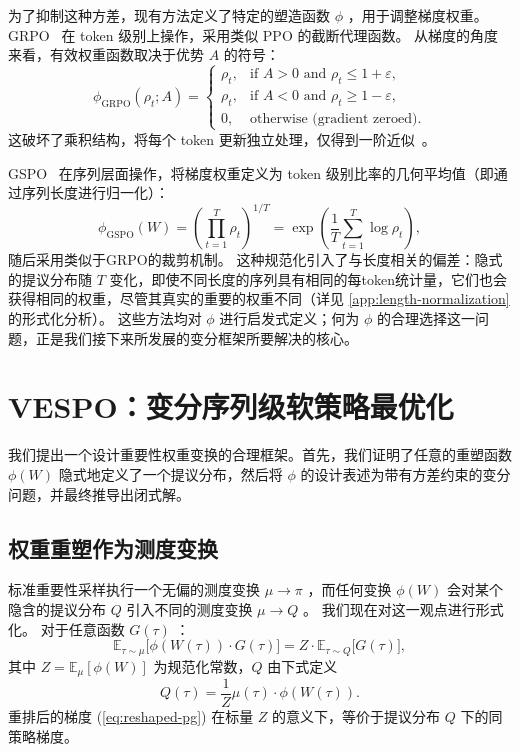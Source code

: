 \documentclass{article}
\theoremstyle{plain}
\theoremstyle{definition}
\theoremstyle{remark}
\begin{document}
为了抑制这种方差，现有方法定义了特定的塑造函数 $\phi$ ，用于调整梯度权重。  
GRPO~\citep{shao2024deepseekmath} 在 token 级别上操作，采用类似 PPO 的截断代理函数。  
从梯度的角度来看，有效权重函数取决于优势 $A$ 的符号：
\begin{equation}
  \label{eq:grpo-phi}
  \phi_{\text{GRPO}}(\rho_t; A) =
  \begin{cases}
    \rho_t, & \text{if } A > 0 \text{ and } \rho_t \leq 1{+}\varepsilon, \\
    \rho_t, & \text{if } A < 0 \text{ and } \rho_t \geq 1{-}\varepsilon, \\
    0,      & \text{otherwise (gradient zeroed)}.
  \end{cases}
\end{equation}
这破坏了乘积结构，将每个 token 更新独立处理，仅得到一阶近似~\citep{Zheng2025StabilizingRL}。

GSPO~\citep{Zheng2025GroupSP} 在序列层面操作，将梯度权重定义为 token 级别比率的几何平均值（即通过序列长度进行归一化）：
\begin{equation}
  \label{eq:gspo-phi}
  \phi_{\text{GSPO}}(W) = \left(\prod_{t=1}^{T} \rho_t\right)^{\!1/T} = \exp\left(\frac{1}{T}\sum_{t=1}^{T}\log\rho_t\right),
\end{equation}
随后采用类似于GRPO的裁剪机制。  
这种规范化引入了与长度相关的偏差：隐式的提议分布随 $T$ 变化，即使不同长度的序列具有相同的每token统计量，它们也会获得相同的权重，尽管其真实的重要的权重不同（详见 \cref{app:length-normalization} 的形式化分析）。  
这些方法均对 $\phi$ 进行启发式定义；何为 $\phi$ 的合理选择这一问题，正是我们接下来所发展的变分框架所要解决的核心。


\section{VESPO：变分序列级软策略最优化}
\label{sec:vespo}

我们提出一个设计重要性权重变换的合理框架。首先，我们证明了任意的重塑函数 $\phi(W)$  隐式地定义了一个提议分布，然后将 $\phi$  的设计表述为带有方差约束的变分问题，并最终推导出闭式解。

\subsection{权重重塑作为测度变换}
\label{sec:measure-change}

标准重要性采样执行一个无偏的测度变换 $\mu \to \pi$ ，而任何变换 $\phi(W)$ 会对某个隐含的提议分布 $Q$ 引入不同的测度变换 $\mu \to Q$ 。  
我们现在对这一观点进行形式化。  
对于任意函数 $G(\tau)$ ：
\begin{equation}
  \label{eq:measure-change}
  \mathbb{E}_{\tau \sim \mu}\bigl[\phi(W(\tau)) \cdot G(\tau)\bigr] = Z \cdot \mathbb{E}_{\tau \sim Q}\bigl[G(\tau)\bigr],
\end{equation}
其中 $Z = \mathbb{E}_{\mu}[\phi(W)]$ 为规范化常数，$Q$ 由下式定义
\begin{equation}
  \label{eq:proposal-def}
  Q(\tau) = \frac{1}{Z} \mu(\tau) \cdot \phi(W(\tau)).
\end{equation}
重排后的梯度 (\cref{eq:reshaped-pg}) 在标量 $Z$ 的意义下，等价于提议分布 $Q$ 下的同策略梯度。
\end{document}

